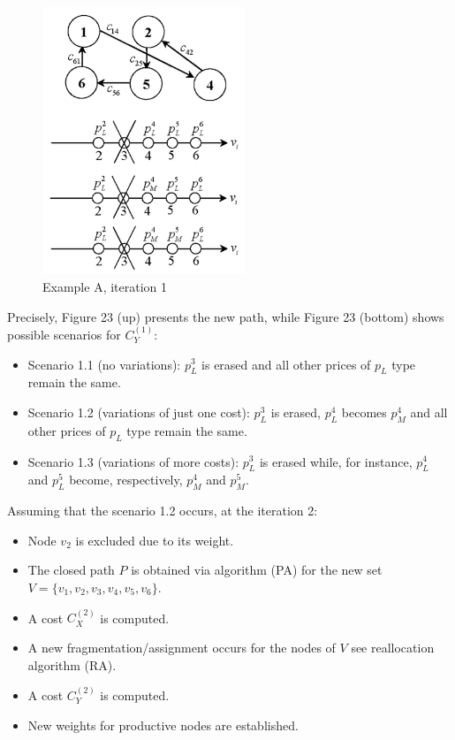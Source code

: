 \begin{figure}[h]
    \centering
    \includegraphics[height=8cm, keepaspectratio]{images/exempleA-it1}
    \caption{Example A, iteration 1}
    \label{fig:exempleA-it1}
\end{figure}
Precisely, Figure 23 (up) presents the new path, while Figure 23 (bottom) shows possible scenarios for $C^{(1)}_Y$:
\begin{itemize}
    \item Scenario 1.1 (no variations): $p^3_L$ is erased and all other prices of $p_L$ type remain the same.
    \item Scenario 1.2 (variations of just one cost): $p^3_L$ is erased, $p^4_L$ becomes $p^4_M$ and all other prices of $p_L$ type remain the same.
    \item Scenario 1.3 (variations of more costs): $p^3_L$  is erased while, for instance, $p^4_L$ and $p^5_L$ become, respectively, $p^4_M$ and $p^5_M$.
\end{itemize}

Assuming that the scenario 1.2 occurs, at the iteration 2:
\begin{itemize}
    \item Node $v_2$ is excluded due to its weight.
    \item The closed path $P$ is obtained via algorithm (PA) for the new set $V = \{v_1,v_2,v_3,v_4, v_5, v_6\}$.
    \item A cost $C_X^{(2)}$ is computed.
    \item A new fragmentation/assignment occurs for the nodes of $V$ see reallocation algorithm (RA).
    \item A cost $C^{(2)}_Y$ is computed.
    \item New weights for productive nodes are established.
\end{itemize}

